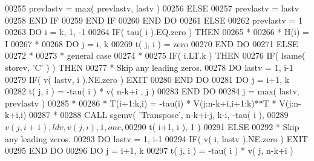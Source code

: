 \begin{DoxyCode}
00255                   prevlastv = max( prevlastv, lastv )
00256                \textcolor{keywordflow}{ELSE}
00257                   prevlastv = lastv
00258 \textcolor{keywordflow}{               END IF}
00259 \textcolor{keywordflow}{            END IF}
00260 \textcolor{keywordflow}{         END DO}
00261       \textcolor{keywordflow}{ELSE}
00262          prevlastv = 1
00263          \textcolor{keywordflow}{DO} i = k, 1, -1
00264             \textcolor{keywordflow}{IF}( tau( i ).EQ.zero ) \textcolor{keywordflow}{THEN}
00265 \textcolor{comment}{*}
00266 \textcolor{comment}{*              H(i)  =  I}
00267 \textcolor{comment}{*}
00268                \textcolor{keywordflow}{DO} j = i, k
00269                   t( j, i ) = zero
00270 \textcolor{keywordflow}{               END DO}
00271             \textcolor{keywordflow}{ELSE}
00272 \textcolor{comment}{*}
00273 \textcolor{comment}{*              general case}
00274 \textcolor{comment}{*}
00275                \textcolor{keywordflow}{IF}( i.LT.k ) \textcolor{keywordflow}{THEN}
00276                   \textcolor{keywordflow}{IF}( lsame( storev, \textcolor{stringliteral}{'C'} ) ) \textcolor{keywordflow}{THEN}
00277 \textcolor{comment}{*                    Skip any leading zeros.}
00278                      \textcolor{keywordflow}{DO} lastv = 1, i-1
00279                         \textcolor{keywordflow}{IF}( v( lastv, i ).NE.zero ) \textcolor{keywordflow}{EXIT}
00280 \textcolor{keywordflow}{                     END DO}
00281                      \textcolor{keywordflow}{DO} j = i+1, k
00282                         t( j, i ) = -tau( i ) * v( n-k+i , j )
00283 \textcolor{keywordflow}{                     END DO}   
00284                      j = max( lastv, prevlastv )
00285 \textcolor{comment}{*}
00286 \textcolor{comment}{*                    T(i+1:k,i) = -tau(i) * V(j:n-k+i,i+1:k)**T * V(j:n-k+i,i)}
00287 \textcolor{comment}{*}
00288                      \textcolor{keyword}{CALL }sgemv( \textcolor{stringliteral}{'Transpose'}, n-k+i-j, k-i, -tau( i ),
00289      $                           v( j, i+1 ), ldv, v( j, i ), 1, one,
00290      $                           t( i+1, i ), 1 )
00291                   \textcolor{keywordflow}{ELSE}
00292 \textcolor{comment}{*                    Skip any leading zeros.}
00293                      \textcolor{keywordflow}{DO} lastv = 1, i-1
00294                         \textcolor{keywordflow}{IF}( v( i, lastv ).NE.zero ) \textcolor{keywordflow}{EXIT}
00295 \textcolor{keywordflow}{                     END DO}
00296                      \textcolor{keywordflow}{DO} j = i+1, k
00297                         t( j, i ) = -tau( i ) * v( j, n-k+i )

\end{DoxyCode}
